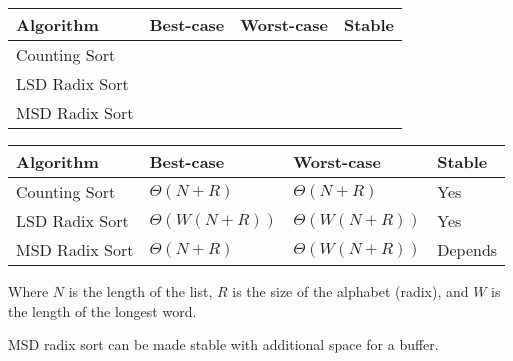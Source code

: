 \ifprintanswers\else
{
\renewcommand{\arraystretch}{2}
\setlength{\tabcolsep}{12pt}
\begin{tabularx}{\textwidth}{Xlll}
Algorithm         & Best-case       & Worst-case          & Stable \\\hline
Counting Sort     &                 &                     &        \\
LSD Radix Sort    &                 &                     &        \\
MSD Radix Sort    &                 &                     &
\end{tabularx}
}
\fi

\begin{solution}
{
\renewcommand{\arraystretch}{2}
\setlength{\tabcolsep}{12pt}
\begin{tabularx}{\textwidth}{Xlll}
Algorithm         & Best-case          & Worst-case          & Stable \\\hline
Counting Sort     & $\Theta(N + R)$    & $\Theta(N + R)$     & Yes    \\
LSD Radix Sort    & $\Theta(W(N + R))$ & $\Theta(W(N + R))$  & Yes    \\
MSD Radix Sort    & $\Theta(N + R)$    & $\Theta(W(N + R))$  & Depends
\end{tabularx}
}

Where $N$ is the length of the list, $R$ is the size of the alphabet (radix),
and $W$ is the length of the longest word.

MSD radix sort can be made stable with additional space for a buffer.
\end{solution}
